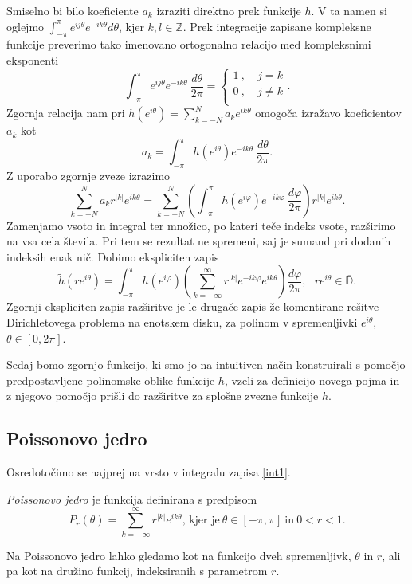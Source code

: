 \documentclass[mat1, tisk]{fmfdelo}
\begin{document}
    Smiselno bi bilo koeficiente $a_k$ izraziti direktno prek funkcije $h$. 
    V ta namen si oglejmo $\int_{-\pi}^{\pi}{e^{ij\theta} e^{-ik\theta}d\theta}$, kjer $k,l \in \mathbb{Z}$. Prek integracije zapisane kompleksne funkcije preverimo tako imenovano ortogonalno relacijo med kompleksnimi eksponenti
        $$
        \int_{-\pi}^{\pi}{e^{ij\theta} e^{-ik\theta}~\frac{d\theta}{2\pi}} = 
        \begin{cases}
            1~,~&j=k\\
            0~,~&j \neq k\\
        \end{cases}
        .$$
    Zgornja relacija nam pri $h(e^{i\theta}) = \sum_{k = -N}^{N}{a_k e^{ik\theta}}$ omogoča izražavo koeficientov $a_k$ kot
        $$
            a_ k = \int_{-\pi}^{\pi}{h \left(e^{i\theta}\right)e^{-ik\theta}~\frac{d\theta}{2\pi}}.
        $$
    Z uporabo zgornje zveze izrazimo
    $$
        \sum_{k = - N}^{N}{ a_k r^{|k|}e^{ik\theta}} = \sum_{k = - N}^{N} \left(\int_{-\pi}^{\pi}{h(e^{i \varphi}) e^{- i k \varphi}~\frac{d \varphi}{2 \pi}}\right) r^{|k|} e^{i k \theta}.
    $$
    Zamenjamo vsoto in integral ter množico, po kateri teče indeks vsote, razširimo na vsa cela števila. Pri tem se rezultat ne spremeni, saj je sumand pri dodanih indeksih enak nič. Dobimo ekspliciten zapis
    \begin{equation}
        \label{int1}
        \widetilde{h}(r e^{i \theta}) = \int_{-\pi}^{\pi}{h(e^{i \varphi}) \left(\sum_{k = - \infty}^{\infty} r^{|k|} e^{- i k \varphi} e^{i k \theta} \right) \frac{d \varphi}{2 \pi}}, ~~~ r e^{i\theta} \in \overline{\mathbb{D}}.
    \end{equation}
    Zgornji ekspliciten zapis razširitve je le drugače zapis že komentirane rešitve Dirichletovega problema na enotskem disku, za polinom v spremenljivki $e^{i \theta}$, \mbox{$\theta \in [0,2\pi]$}.
    
    Sedaj bomo zgornjo funkcijo, ki smo jo na intuitiven način konstruirali s pomočjo predpostavljene polinomske oblike funkcije $h$, vzeli za definicijo novega pojma in z njegovo pomočjo prišli do razširitve za splošne zvezne funkcije $h$.
    
\subsection{Poissonovo jedro}

    Osredotočimo se najprej na vrsto v integralu zapisa \eqref{int1}.

    \begin{definicija}
        \emph{Poissonovo jedro} je funkcija definirana s predpisom
        $$
           P_r(\theta) = \sum_{k = -\infty}^{\infty}{r^{|k|} e^{i k \theta}}\text{, kjer je}~\theta \in [-\pi, \pi]~\text{in}~ 0 < r < 1.
        $$
    \end{definicija}
    \begin{opomba}
        Na Poissonovo jedro lahko gledamo kot na funkcijo dveh spremenljivk, $\theta$ in $r$, ali pa kot na družino funkcij, indeksiranih s parametrom $r$.
    \end{opomba}
\end{document}
